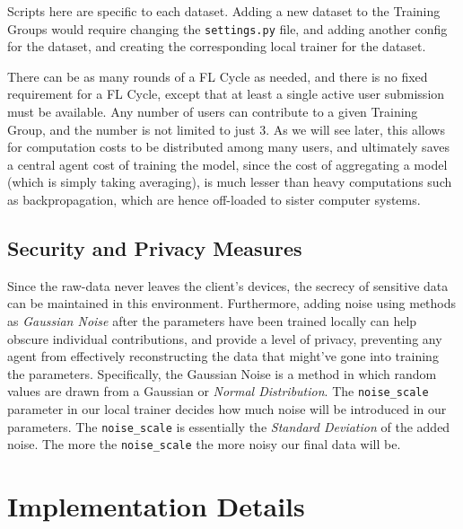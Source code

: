 \documentclass[10pt,twocolumn]{article}
\begin{document}
Scripts here are specific to each dataset. Adding a new dataset to the Training Groups would require changing the \texttt{settings.py} file, and adding another config for the dataset, and creating the corresponding local trainer for the dataset. 

There can be as many rounds of a FL Cycle as needed, and there is no fixed requirement for a FL Cycle, except that at least a single active user submission must be available. Any number of users can contribute to a given Training Group, and the number is not limited to just 3. As we will see later, this allows for computation costs to be distributed among many users, and ultimately saves a central agent cost of training the model, since the cost of aggregating a model (which is simply taking averaging), is much lesser than heavy computations such as backpropagation, which are hence off-loaded to sister computer systems.

\subsection{Security and Privacy Measures}
Since the raw-data never leaves the client's devices, the secrecy of sensitive data can be maintained in this environment. Furthermore, adding noise using methods as \textit{Gaussian Noise} after the parameters have been trained locally can help obscure individual contributions, and provide a level of privacy, preventing any agent from effectively reconstructing the data that might've gone into training the parameters. Specifically, the Gaussian Noise is a method in which random values are drawn from a Gaussian or \textit{Normal Distribution}. The \texttt{noise\_scale} parameter in our local trainer decides how much noise will be introduced in our parameters. The \texttt{noise\_scale} is essentially the \textit{Standard Deviation} of the added noise. The more the \texttt{noise\_scale} the more noisy our final data will be.

\section{Implementation Details}
\end{document}
